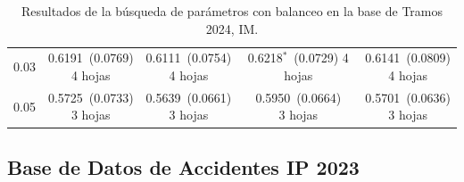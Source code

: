 \documentclass[twoside,a4paper,12pt,onecolumn,openany]{book}
\begin{document}
\begin{table}[H]
\begin{tabular}{r|cccc}
0.03 & \shortstack{0.6191~(0.0769)\\ 4 hojas} & \shortstack{0.6111~(0.0754)\\ 4 hojas} & \shortstack{0.6218$^{*}$~(0.0729)\\ 4 hojas} & \shortstack{0.6141~(0.0809)\\ 4 hojas} \\[4pt]
0.05 & \shortstack{0.5725~(0.0733)\\ 3 hojas} & \shortstack{0.5639~(0.0661)\\ 3 hojas} & \shortstack{0.5950~(0.0664)\\ 3 hojas} & \shortstack{0.5701~(0.0636)\\ 3 hojas} \\[4pt]
\bottomrule
\end{tabular}
\caption{Resultados de la búsqueda de parámetros con balanceo en la base de Tramos 2024, IM.}
\label{tab:busqueda_im_2024}
\end{table}
 
\vspace{0.1cm}
 
\subsection*{Base de Datos de Accidentes IP 2023}
 
\end{document}
